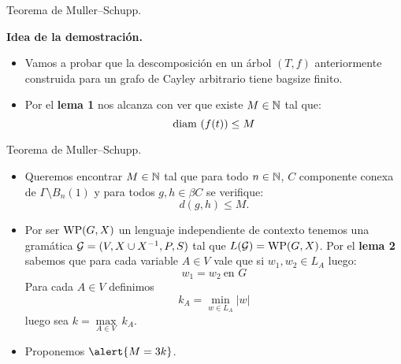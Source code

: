 \documentclass[aspectratio=169, 10pt]{beamer}
\begin{document}
	\begin{frame}[fragile]{Teorema de Muller--Schupp.}

		\textbf{Idea de la demostración.}
		\begin{itemize}
			\item Vamos a probar que la descomposición en un árbol $(T,f)$ anteriormente construida para un grafo de Cayley arbitrario tiene bagsize finito.
			
			\item Por el \textbf{lema 1} nos alcanza con ver que existe $M \in \mathbb{N}$ tal que:
			\[
				\text{diam}\ (f(t)) \le M 
			\]  

		\end{itemize}
	\end{frame}

	\begin{frame}[fragile]{Teorema de Muller--Schupp.}
		\begin{itemize}
			\item Queremos encontrar $M \in \mathbb{N}$ tal que para todo $n \in \mathbb{N}$, $C$ componente conexa de $\Gamma \setminus B_{n}(1)$
			y para todos $g,h \in \beta C$ se verifique:
			\[
				d(g,h) \le M.
			\]

			\item Por ser $\text{WP}(G, X)$ un lenguaje independiente de contexto tenemos una gramática ${\cal G} = (V,X \cup X^{-1}, P, S)$ tal que $L({\cal G}) = \text{WP}(G, X)$.
			Por el \textbf{lema 2} sabemos que para cada variable $A \in V$ vale que si $w_{1},w_{2} \in L_{A}$ luego:
			\[
				w_{1} = w_{2} \ \text{en } G
			\]
			Para cada $A \in V$ definimos 
			\[
				k_{A} = \underset{w \in L_{A}}{\min} |w|
			\]
			luego sea $k = \underset{A \in V}{\max} \ k_{A}$.

			\item Proponemos $\alert{M = 3k}$.
		\end{itemize}
	\end{frame}
\end{document}
